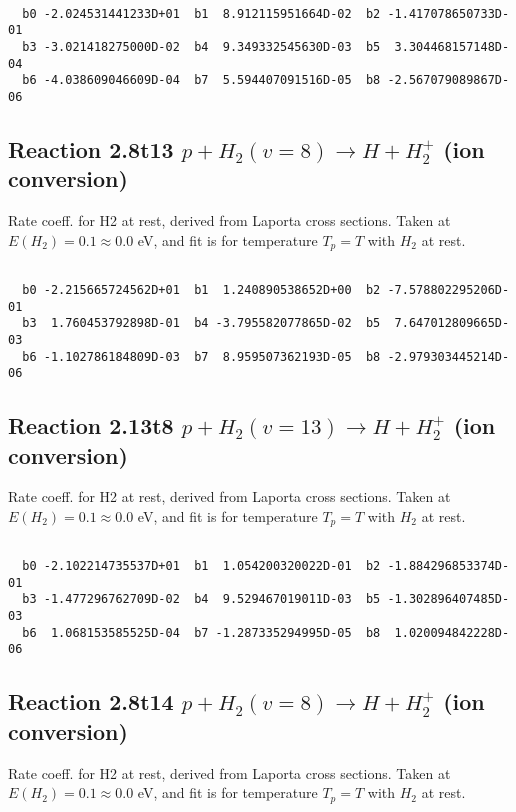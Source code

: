 \begin{small}\begin{verbatim}

  b0 -2.024531441233D+01  b1  8.912115951664D-02  b2 -1.417078650733D-01
  b3 -3.021418275000D-02  b4  9.349332545630D-03  b5  3.304468157148D-04
  b6 -4.038609046609D-04  b7  5.594407091516D-05  b8 -2.567079089867D-06

\end{verbatim}\end{small}

\newpage
\subsection{
Reaction 2.8t13
$ p + H_2(v=8) \rightarrow H + H_2^+$ (ion conversion)
}
Rate coeff. for H2 at rest, derived from Laporta cross sections.
Taken at $E(H_2) = 0.1 \approx 0.0$ eV,  and fit is for temperature $T_p=T$ with $H_2$ at rest.

\begin{small}\begin{verbatim}

  b0 -2.215665724562D+01  b1  1.240890538652D+00  b2 -7.578802295206D-01
  b3  1.760453792898D-01  b4 -3.795582077865D-02  b5  7.647012809665D-03
  b6 -1.102786184809D-03  b7  8.959507362193D-05  b8 -2.979303445214D-06

\end{verbatim}\end{small}

\newpage
\subsection{
Reaction 2.13t8
$ p + H_2(v=13) \rightarrow H + H_2^+$ (ion conversion)
}
Rate coeff. for H2 at rest, derived from Laporta cross sections.
Taken at $E(H_2) = 0.1 \approx 0.0$ eV,  and fit is for temperature $T_p=T$ with $H_2$ at rest.

\begin{small}\begin{verbatim}

  b0 -2.102214735537D+01  b1  1.054200320022D-01  b2 -1.884296853374D-01
  b3 -1.477296762709D-02  b4  9.529467019011D-03  b5 -1.302896407485D-03
  b6  1.068153585525D-04  b7 -1.287335294995D-05  b8  1.020094842228D-06

\end{verbatim}\end{small}

\newpage
\subsection{
Reaction 2.8t14
$ p + H_2(v=8) \rightarrow H + H_2^+$ (ion conversion)
}
Rate coeff. for H2 at rest, derived from Laporta cross sections.
Taken at $E(H_2) = 0.1 \approx 0.0$ eV,  and fit is for temperature $T_p=T$ with $H_2$ at rest.

